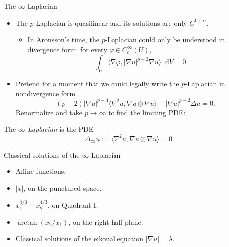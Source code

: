 \documentclass[10pt]{beamer}
\newcommand*\dif{\mathop{}\!\mathrm{d}}
\begin{document}
\begin{frame}{The $\infty$-Laplacian}
\begin{itemize}
\item The $p$-Laplacian is quasilinear and its solutions are only $C^{1 + \alpha}$.
\begin{itemize}
\item In Aronsson's time, the $p$-Laplacian could only be understood in divergence form: for every $\varphi \in C^\infty_c(U)$,
$$\int_U \langle \nabla \varphi, |\nabla u|^{p - 2} \nabla u\rangle \dif V = 0.$$
\end{itemize}
\item Pretend for a moment that we could legally write the $p$-Laplacian in nondivergence form 
$$(p - 2) |\nabla u|^{p - 4} \langle \nabla^2 u, \nabla u \otimes \nabla u\rangle + |\nabla u|^{p - 2} \Delta u = 0.$$
Renormalize and take $p \to \infty$ to find the limiting PDE: 
\end{itemize} 

\begin{definition}
The \emph{$\infty$-Laplacian} is the PDE 
$$\Delta_\infty u := \langle \nabla^2 u, \nabla u \otimes \nabla u\rangle = 0.$$
\end{definition}
\end{frame}

\begin{frame}{Classical solutions of the $\infty$-Laplacian}
\begin{itemize}
\item Affine functions.
\item $|x|$, on the punctured space.
\item $x_1^{4/3} - x_2^{4/3}$, on Quadrant I.
\item $\arctan(x_2/x_1)$, on the right half-plane.
\item Classical solutions of the eikonal equation $|\nabla u| = \lambda$.
\end{itemize}
\end{frame}
\end{document}
